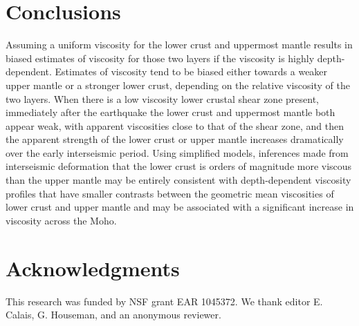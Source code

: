 \section{Conclusions}
Assuming a uniform viscosity for the lower crust and uppermost mantle
results in biased estimates of viscosity for those two layers if the
viscosity is highly depth-dependent.  Estimates of viscosity tend to
be biased either towards a weaker upper mantle or a stronger lower
crust, depending on the relative viscosity of the two layers.  When
there is a low viscosity lower crustal shear zone present, immediately
after the earthquake the lower crust and uppermost mantle both appear
weak, with apparent viscosities close to that of the shear zone, and
then the apparent strength of the lower crust or upper mantle
increases dramatically over the early interseismic period.  Using
simplified models, inferences made from interseismic deformation that
the lower crust is orders of magnitude more viscous than the upper
mantle may be entirely consistent with depth-dependent viscosity
profiles that have smaller contrasts between the geometric mean
viscosities of lower crust and upper mantle and may be associated with
a significant increase in viscosity across the Moho.

\section{Acknowledgments}
This research was funded by NSF grant EAR 1045372. We thank editor E.
Calais, G. Houseman, and an anonymous reviewer.








